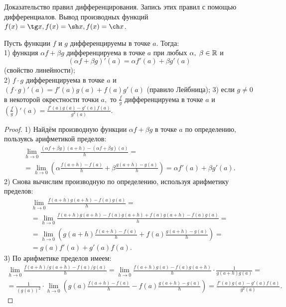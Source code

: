 \begin{problem}
Доказательство правил дифференцирования. Запись этих правил с помощью дифференциалов. Вывод производных функций $f(x) = \tg x, f(x) = \sh x, f(x) = \ch x$.
\end{problem}\begin{proposition}
Пусть функции $f$ и $g$ дифференцируемы
в точке $a.$ Тогда:\\
1) функция $\alpha f+\beta g$ дифференцируема
в точке $a$ при любых $\alpha,\;\beta\in \mathbb{R}$
и $$(\alpha f+\beta g)'(a)=
\alpha f'(a)+\beta g'(a)$$
(свойство линейности);\\
2) $f\cdot g$ дифференцируема в точке $a$
и $(f\cdot g)'(a)=f'(a)g(a)+f(a)g'(a)$
(правило Лейбница);
3) если $g\neq0$ в некоторой окрестности
точки $a,$ то  $\frac{f}{g}$ дифференцируема
в точке $a$ и $\left(\frac{f}{g}\right)'(a)=
\frac{f'(a)g(a)-g'(a)f(a)}{g^2(a)}.$
\end{proposition}
\begin{proof}
1) Найдём производную функции $\alpha f+\beta g$
в точке $a$ по определению, пользуясь арифметикой
пределов:
\begin{multline*}
\lim\limits_{h\rightarrow0}
\frac{(\alpha f+\beta g)(a+h)-
(\alpha f+\beta g)(a)}{h}=\\
=\lim\limits_{h\rightarrow0}
\left(\alpha\frac{f(a+h)-f(a)}{h}
+\beta\frac{g(a+h)-g(a)}{h}\right)=
\alpha f'(a)+\beta g'(a).
\end{multline*}
2) Снова вычислим производную по определению,
используя арифметику пределов:
\begin{multline*}
\lim\limits_{h\rightarrow0}
\frac{f(a+h)g(a+h)-f(a)g(a)}{h}=\\=
\lim\limits_{h\rightarrow0}
\frac{f(a+h)g(a+h)-f(a)g(a+h)+
f(a)g(a+h)-f(a)g(a)}{h}=\\=
\lim\limits_{h\rightarrow0}
\left(g(a+h)\frac{f(a+h)-f(a)}{h}+
f(a)\frac{g(a+h)-g(a)}{h}\right)=\\=
g(a)f'(a)+g'(a)f(a).
\end{multline*}
3) По арифметике пределов имеем:
\begin{multline*}
\lim\limits_{h\rightarrow0}
\frac{f(a+h)/g(a+h)-f(a)/g(a)}{h}=
\lim\limits_{h\rightarrow0}
\frac{f(a+h)g(a)-f(a)g(a+h)}{h}\cdot
\frac{1}{g(a+h)g(a)}=\\=
\frac{1}{(g(a))^2}\cdot\lim\limits_{h\rightarrow0}
\left(g(a)\frac{f(a+h)-f(a)}{h}-
f(a)\frac{g(a+h)-g(a)}{h}\right)=
\frac{f'(a)g(a)-g'(a)f(a)}{g^2(a)}.
\end{multline*}
\end{proof}
